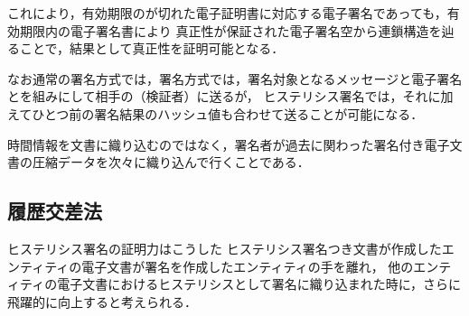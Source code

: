\documentclass[a4paper,12pt]{jsarticle}
\begin{document}
これにより，有効期限のが切れた電子証明書に対応する電子署名であっても，有効期限内の電子署名書により
真正性が保証された電子署名空から連鎖構造を辿ることで，結果として真正性を証明可能となる．

なお通常の署名方式では，署名方式では，署名対象となるメッセージと電子署名とを組みにして相手の（検証者）に送るが，
ヒステリシス署名では，それに加えてひとつ前の署名結果のハッシュ値も合わせて送ることが可能になる．

時間情報を文書に織り込むのではなく，署名者が過去に関わった署名付き電子文書の圧縮データを次々に織り込んで行くことである．









      \subsection{履歴交差法}
ヒステリシス署名の証明力はこうした
ヒステリシス署名つき文書が作成したエンティティの電子文書が署名を作成したエンティティの手を離れ，
他のエンティティの電子文書におけるヒステリシスとして署名に織り込まれた時に，さらに飛躍的に向上すると考えられる．
\end{document}
